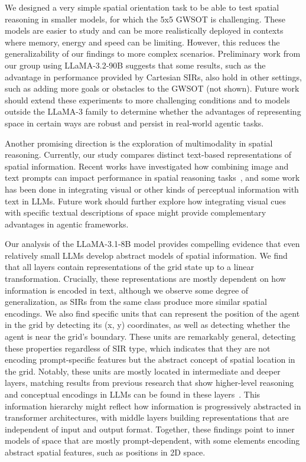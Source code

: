 \documentclass[runningheads]{llncs}
\begin{document}
We designed a very simple spatial orientation task to be able to test spatial reasoning in smaller models, for which the 5x5 GWSOT is challenging. These models are easier to study and can be more realistically deployed in contexts where memory, energy and speed can be limiting. However, this reduces the generalizability of our findings to more complex scenarios. Preliminary work from our group using LLaMA-3.2-90B suggests that some results, such as the advantage in performance provided by Cartesian SIRs, also hold in other settings, such as adding more goals or obstacles to the GWSOT (not shown). Future work should extend these experiments to more challenging conditions and to models outside the LLaMA-3 family to determine whether the advantages of representing space in certain ways are robust and persist in real-world agentic tasks.

Another promising direction is the exploration of multimodality in spatial reasoning. Currently, our study compares distinct text-based representations of spatial information. Recent works have investigated how combining image and text prompts can impact performance in spatial reasoning tasks~\cite{Wang2024,Ranasinghe2024}, and some work has been done in integrating visual or other kinds of perceptual information with text in LLMs\cite{Driess2023, Zheng2023, Schumann2023}. Future work should further explore how integrating visual cues with specific textual descriptions of space might provide complementary advantages in agentic frameworks.

Our analysis of the LLaMA-3.1-8B model provides compelling evidence that even relatively small LLMs develop abstract models of spatial information. We find that all layers contain representations of the grid state up to a linear transformation. Crucially, these representations are mostly dependent on how information is encoded in text, although we observe some degree of generalization, as SIRs from the same class produce more similar spatial encodings. We also find specific units that can represent the position of the agent in the grid by detecting its (x, y) coordinates, as well as detecting whether the agent is near the grid’s boundary. These units are remarkably general, detecting these properties regardless of SIR type, which indicates that they are not encoding prompt-specific features but the abstract concept of spatial location in the grid. Notably, these units are mostly located in intermediate and deeper layers, matching results from previous research that show higher-level reasoning and conceptual encodings in LLMs can be found in these layers~\cite{Geva2020,Durrani2022,Meng2022,Gurnee2023}. This information hierarchy might reflect how information is progressively abstracted in transformer architectures, with middle layers building representations that are independent of input and output format. Together, these findings point to inner models of space that are mostly prompt-dependent, with some elements encoding abstract spatial features, such as positions in 2D space.
\end{document}
